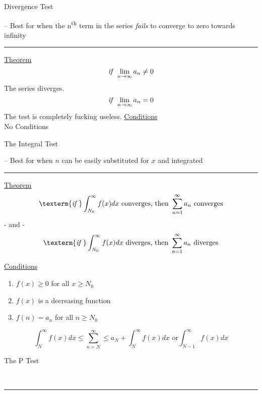 \documentclass{article}
\begin{document}
\begin{large}
    Divergence Test
\end{large} -- Best for when the n\textsuperscript{th} term in the series \textit{fails} to converge to zero towards infinity\\
\noindent\rule{\textwidth}{0.5pt}
\begin{multicols}{2}
\begin{center}
    \underline{Theorem}
    \medskip
    \[
        \textrm{\textit{if  }} \lim_{n \to \infty}a_n \neq 0
    \]
    The series diverges.
    \[
        \textrm{\textit{if  }} \lim_{n \to \infty}a_n = 0
    \]
    The test is completely fucking useless.
    \vfill\null\columnbreak
    \underline{Conditions}\\\bigskip
    No Conditions
    \end{center}
\end{multicols}

\begin{large}
    The Integral Test
\end{large} -- Best for when $n$ can be easily substituted for $x$ and integrated\\
\noindent\rule{\textwidth}{0.5pt}
\begin{multicols}{2}
\begin{center}
    \underline{Theorem}
    \medskip
    \[
         \texterm{\textit{if }} \int_{N_0}^\infty{f(x)dx} \textrm{  converges, then }  \sum_{n = 1}^\infty{a_n}\textrm{  converges}
    \]
     - and -
    \[
        \texterm{\textit{if }} \int_{N_0}^\infty{f(x)dx} \textrm{  diverges, then }  \sum_{n = 1}^\infty{a_n}\textrm{  diverges}
    \]

    \vfill\null\columnbreak
    \underline{Conditions}
    \end{center}
    \begin{enumerate}
        \item $f(x) \geq 0$ for all $x \geq N_0$
        \item $f(x)$ is a decreasing function
        \item $f(n) = a_n$ for all $n \geq N_0$
    \end{enumerate}
    \begin{center}
    \[
        \int_N^\infty f(x)dx \leq \sum_{n=N}^\infty \leq a_N + \int_N^\infty f(x)dx \textrm{  or} \int_{N-1}^\infty f(x)dx
    \]
    \end{center}
\end{multicols}
\pagebreak
\begin{large}
    The P Test
\end{large}\\
\noindent\rule{\textwidth}{0.5pt}
\end{document}
